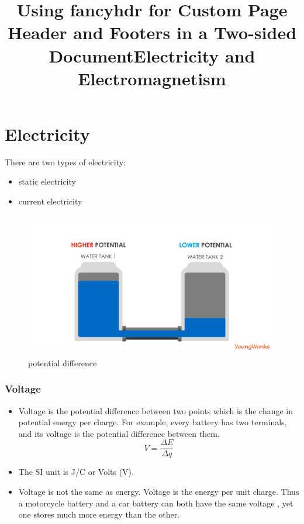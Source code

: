 \documentclass[12pt]{book}
\title{Using fancyhdr for Custom Page Header and Footers in a Two-sided Document}
\begin{document}
\setcounter{secnumdepth}{0}

\title{Electricity and Electromagnetism}
\maketitle
\tableofcontents
\newpage

\setcounter{page}{1}
\graphicspath{ {../} }
\chapter{Electricity}
There are two types of electricity:
\begin{itemize}
	\item static electricity
	\item current electricity
\end{itemize}

\begin{figure}
\includegraphics[scale=0.15]{Water_Flow_1.png}

\caption{potential difference}
\end{figure}

\subsection{Voltage}
\begin{itemize}
  		\item Voltage is the potential difference  between two points which is the change in potential energy per charge.  For example, every battery has two terminals, and its voltage is the potential difference between them.
  		 $$ V = \frac{\Delta E}{\Delta q}$$

  		 \item The SI unit is J/C or Volts (V).
  	\item Voltage is not the same as energy. Voltage is the energy per unit charge. Thus a motorcycle battery and a car battery can both have the same voltage , yet one stores much more energy than the other.
\end{itemize}
\end{document}
